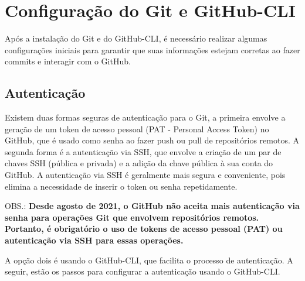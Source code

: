 \section{Configuração do Git e GitHub-CLI}
Após a instalação do Git e do GitHub-CLI, é necessário realizar algumas configurações iniciais para garantir que suas informações estejam corretas ao fazer commits e interagir com o GitHub.
\par
\subsection{Autenticação}
Existem duas formas seguras de autenticação para o Git, a primeira envolve a geração de um token de acesso pessoal (PAT - Personal Access Token) no GitHub, que é usado como senha ao fazer push ou pull de repositórios remotos. A segunda forma é a autenticação via SSH, que envolve a criação de um par de chaves SSH (pública e privada) e a adição da chave pública à sua conta do GitHub. A autenticação via SSH é geralmente mais segura e conveniente, pois elimina a necessidade de inserir o token ou senha repetidamente.

OBS.: \textbf{Desde agosto de 2021, o GitHub não aceita mais autenticação via senha para operações Git que envolvem repositórios remotos. Portanto, é obrigatório o uso de tokens de acesso pessoal (PAT) ou autenticação via SSH para essas operações.}

A opção dois é usando o GitHub-CLI, que facilita o processo de autenticação. A seguir, estão os passos para configurar a autenticação usando o GitHub-CLI.
\par
